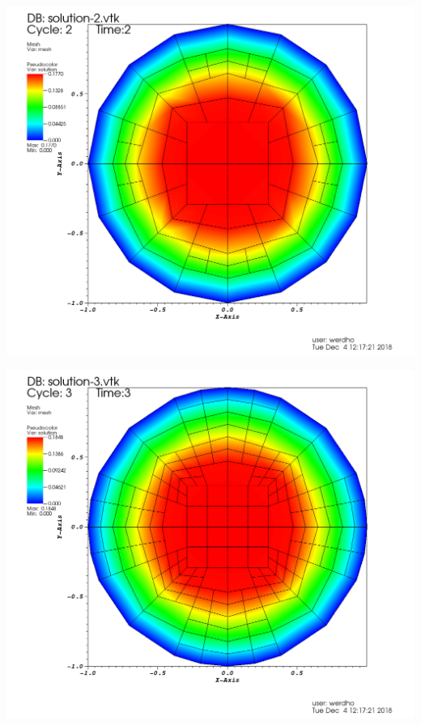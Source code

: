 \documentclass[9pt]{beamer}
\begin{document}
\begin{frame}
\begin{minipage}{.45\paperwidth}
	\includegraphics[scale=.12]{solu-4-3.png}
\end{minipage}%
\begin{minipage}{.4\paperwidth}
	\centering
	\includegraphics[scale=.12]{solu-4-4.png}
\end{minipage}
\end{frame}
\end{document}
